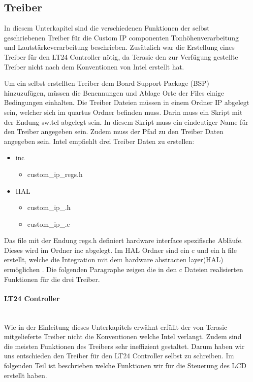 \subsection{Treiber}\label{subsec:drivers}
In diesem Unterkapitel sind die verschiedenen Funktionen der selbst geschriebenen Treiber für die Custom IP componenten Tonhöhenverarbeitung und Lautstärkeverarbeitung  beschrieben. Zusätzlich war die Erstellung  eines Treiber für den LT24 Controller nötig, da Terasic den zur Verfügung gestellte Treiber nicht nach dem Konventionen von Intel erstellt hat.

Um ein selbst erstellten Treiber dem Board Support Package (BSP) hinzuzufügen, müssen  die Benennungen und Ablage Orte der Files einige Bedingungen einhalten.  
 Die Treiber Dateien müssen in einem Ordner IP abgelegt sein, welcher sich im quartus Ordner befinden muss. Darin muss ein Skript mit der Endung sw.tcl abgelegt sein. In diesem Skript muss ein eindeutiger Name für den Treiber angegeben sein. Zudem muss der Pfad zu den Treiber Daten angegeben sein. Intel empfiehlt drei Treiber Daten zu erstellen:
  \renewcommand{\labelitemi}{$\blacksquare$}
 \renewcommand\labelitemii{$\square$}
 \begin{itemize}
 	\item  inc
 	\begin{itemize}
 		\item  custom\_ip\_regs.h
 	\end{itemize}
 \end{itemize}
 \begin{itemize}
	\item  HAL
	\begin{itemize}
		\item  custom\_ip\_.h
		\item  custom\_ip\_.c
	\end{itemize}
\end{itemize}

  Das file mit der Endung regs.h definiert hardware interface spezifische Abläufe. Dieses wird im Ordner inc abgelegt. Im HAL Ordner sind ein c und ein h file erstellt, welche die Integration mit dem hardware abstracten layer(HAL) ermöglichen \cite{NIOS_II_soft}.
 Die folgenden Paragraphe zeigen die in den c Dateien realisierten Funktionen für die drei Treiber.
\paragraph{LT24 Controller}\mbox{}\\
Wie in der Einleitung dieses Unterkapitels erwähnt erfüllt der von Terasic mitgelieferte Treiber nicht die Konventionen welche Intel verlangt. Zudem sind die meisten Funktionen des Treibers sehr ineffizient gestaltet. Darum haben wir uns entschieden den Treiber für den LT24 Controller selbst zu schreiben. Im folgenden Teil ist beschrieben welche Funktionen wir für die Steuerung des LCD erstellt haben.

